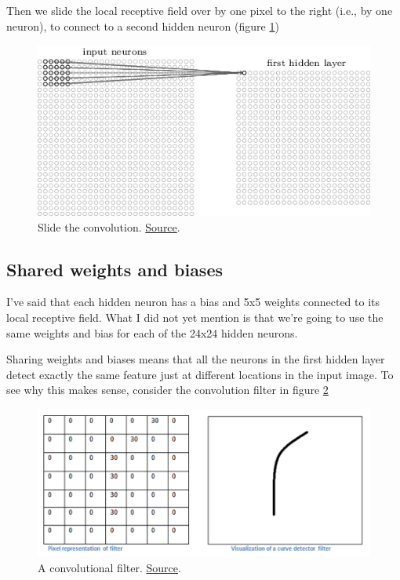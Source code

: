 \documentclass[a4paper]{tufte-handout}
\begin{document}
Then we slide the local receptive field over by one pixel
 to the right (i.e., by one
neuron), to connect to a second hidden neuron
 (figure \ref{fig:conv2sd})

\begin{figure}
  \includegraphics[width=\linewidth]{conv3}
  \caption{Slide the convolution.
\href{http://neuralnetworksanddeeplearning.com/chap6.html\%22}{Source}.
}
\label{fig:conv2sd}
\end{figure}


\subsection{Shared weights and biases}

I've said that each hidden neuron has a bias and 5x5 weights connected
to its local receptive field. What I did not yet mention is that we're
going to use the same weights and bias for each of the 24x24 hidden
neurons.

Sharing weights and biases means that all the neurons in the first
hidden layer detect exactly the same feature just at different locations
in the input image. To see why this makes sense, consider the
convolution filter in figure \ref{fig:1}

\begin{figure}[!htb]
\includegraphics[width=0.7\linewidth]{conv_example1.png}
\caption{A convolutional filter.
\href{https://adeshpande3.github.io/adeshpande3.github.io/A-Beginner's-Guide-To-Understanding-Convolutional-Neural-Networks/}{Source}.
}
\label{fig:1}
\end{figure}
\end{document}
